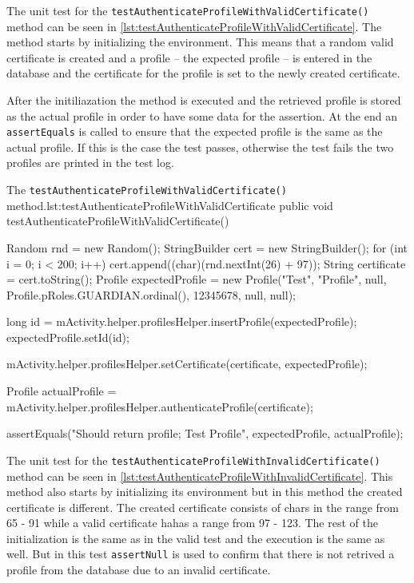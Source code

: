The unit test for the \texttt{testAuthenticateProfileWithValidCertificate()} method can be seen in \autoref{lst:testAuthenticateProfileWithValidCertificate}.
The method starts by initializing the environment.
This means that a random valid certificate is created and a profile -- the expected profile -- is entered in the database and the certificate for the profile is set to the newly created certificate.

After the initiliazation the method is executed and the retrieved profile is stored as the actual profile in order to have some data for the assertion.
At the end an \texttt{assertEquals} is called to ensure that the expected profile is the same as the actual profile.
If this is the case the test passes, otherwise the test fails the two profiles are printed in the test log. 


\begin{Java}{The \texttt{testAuthenticateProfileWithValidCertificate()} method.}{lst:testAuthenticateProfileWithValidCertificate}
public void testAuthenticateProfileWithValidCertificate() {
	Random rnd = new Random();
	StringBuilder cert = new StringBuilder();
	for (int i = 0; i < 200; i++)
	{
		cert.append((char)(rnd.nextInt(26) + 97));
	}
	String certificate = cert.toString();
	Profile expectedProfile = new Profile("Test", "Profile", null, Profile.pRoles.GUARDIAN.ordinal(), 12345678, null, null);

	long id = mActivity.helper.profilesHelper.insertProfile(expectedProfile);
	expectedProfile.setId(id);
	
	mActivity.helper.profilesHelper.setCertificate(certificate, expectedProfile);

	Profile actualProfile = mActivity.helper.profilesHelper.authenticateProfile(certificate);

	assertEquals("Should return profile; Test Profile", expectedProfile, actualProfile);
}
\end{Java}

The unit test for the \texttt{testAuthenticateProfileWithInvalidCertificate()} method can be seen in \autoref{lst:testAuthenticateProfileWithInvalidCertificate}.
This method also starts by initializing its environment but in this method the created certificate is different.
The created certificate consists of chars in the range from 65 - 91 while a valid certificate hahas a range from 97 - 123.
The rest of the initialization is the same as in the valid test and the execution is the same as well.
But in this test \texttt{assertNull} is used to confirm that there is not retrived a profile from the database due to an invalid certificate.

